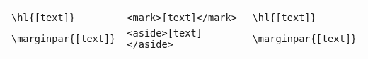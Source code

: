 \documentclass[]{article}
\begin{document}
\begin{longtable}[]{@{}lll@{}}
\begin{minipage}[t]{0.31\columnwidth}
\strut\end{minipage}\tabularnewline
\begin{minipage}[t]{0.28\columnwidth}\raggedright\strut
\texttt{\textbackslash{}hl\{{[}text{]}\}}
\strut\end{minipage} &
\begin{minipage}[t]{0.33\columnwidth}\raggedright\strut
\texttt{\textless{}mark\textgreater{}{[}text{]}\textless{}/mark\textgreater{}}
\strut\end{minipage} &
\begin{minipage}[t]{0.31\columnwidth}\raggedright\strut
\texttt{\textbackslash{}hl\{{[}text{]}\}}
\strut\end{minipage}\tabularnewline
\begin{minipage}[t]{0.28\columnwidth}\raggedright\strut
\texttt{\textbackslash{}marginpar\{{[}text{]}\}}
\strut\end{minipage} &
\begin{minipage}[t]{0.33\columnwidth}\raggedright\strut
\texttt{\textless{}aside\textgreater{}{[}text{]}\textless{}/aside\textgreater{}}
\strut\end{minipage} &
\begin{minipage}[t]{0.31\columnwidth}\raggedright\strut
\texttt{\textbackslash{}marginpar\{{[}text{]}\}}
\strut\end{minipage}\tabularnewline
\bottomrule
\end{longtable}
\end{document}
